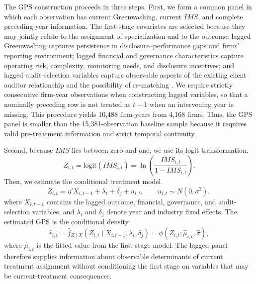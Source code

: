 \documentclass[11pt]{article}
\begin{document}
The GPS construction proceeds in three steps. 
First, we form a common panel in which each observation has current Greenwashing, current \(IMS\), and complete preceding-year information. 
The first-stage covariates are selected because they may jointly relate to the assignment of specialization and to the outcome: lagged Greenwashing captures persistence in disclosure--performance gaps and firms' reporting environment; 
lagged financial and governance characteristics capture operating risk, complexity, monitoring needs, and disclosure incentives; 
and lagged audit-selection variables capture observable aspects of the existing client--auditor relationship and the possibility of re-matching \citep{shipman2017psm}. 
We require strictly consecutive firm-year observations when constructing lagged variables, so that a nominally preceding row is not treated as \(t-1\) when an intervening year is missing. 
This procedure yields 10,488 firm-years from 4,168 firms. 
Thus, the GPS panel is smaller than the 15,381-observation baseline sample because it requires valid pre-treatment information and strict temporal continuity.

Second, because \(IMS\) lies between zero and one, we use its logit transformation,
\[
Z_{i,t}=\mathrm{logit}(IMS_{i,t})=\ln\left(\frac{IMS_{i,t}}{1-IMS_{i,t}}\right).
\]
Then, we estimate the conditional treatment model
\[
Z_{i,t}=\eta'X_{i,t-1}+\lambda_t+\delta_j+u_{i,t},
\qquad u_{i,t}\sim N(0,\sigma^2),
\]
where \(X_{i,t-1}\) contains the lagged outcome, financial, governance, and audit-selection variables, and \(\lambda_t\) and \(\delta_j\) denote year and industry fixed effects. The estimated GPS is the conditional density
\[
\widehat r_{i,t}=\widehat f_{Z\mid X}\left(Z_{i,t}\mid X_{i,t-1},\lambda_t,\delta_j\right)
=\phi\left(Z_{i,t};\widehat\mu_{i,t},\widehat\sigma\right),
\]
where \(\widehat\mu_{i,t}\) is the fitted value from the first-stage model. The lagged panel therefore supplies information about observable determinants of current treatment assignment without conditioning the first stage on variables that may be current-treatment consequences.
\end{document}
